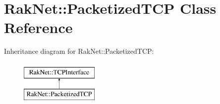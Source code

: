 \hypertarget{class_rak_net_1_1_packetized_t_c_p}{\section{Rak\-Net\-:\-:Packetized\-T\-C\-P Class Reference}
\label{class_rak_net_1_1_packetized_t_c_p}
}
Inheritance diagram for Rak\-Net\-:\-:Packetized\-T\-C\-P\-:\begin{figure}[H]
\begin{center}
\leavevmode
\includegraphics[height=2.000000cm]{class_rak_net_1_1_packetized_t_c_p}
\end{center}
\end{figure}
